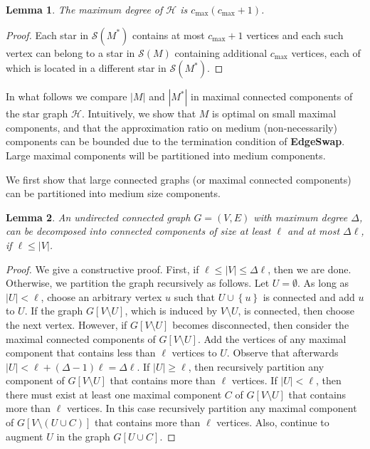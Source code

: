 \documentclass[11pt]{article}
\newtheorem{lemma}{Lemma}
\newcommand{\set}[1]{\left\{ #1 \right\}}
\newcommand{\abs}[1]{\left| #1 \right|}
\newcommand{\cmax}{c_{\max}}
\newcommand{\calS}{\mathcal{S}}
\newcommand{\calH}{\mathcal{H}}
\begin{document}
\begin{lemma}
\label{lemma:maxdegH}
The maximum degree of $\calH$ is $\cmax(\cmax+1)$.
\end{lemma}
\begin{proof}
Each star in $\calS(M^*)$ contains at most $\cmax+1$ vertices and each
such vertex can belong to a star in $\calS(M)$ containing additional
$\cmax$ vertices, each of which is located in a different star in
$\calS(M^*)$.
\end{proof}

In what follows we compare $\abs{M}$ and $\abs{M^*}$ in maximal
connected components of the star graph $\calH$.  Intuitively, we show
that $M$ is optimal on small maximal components, and that the
approximation ratio on medium (non-necessarily) components can be
bounded due to the termination condition of \textbf{EdgeSwap}.  Large
maximal components will be partitioned into medium components.

We first show that large connected graphs (or maximal connected
components) can be partitioned into medium size components.

\begin{lemma}
\label{lemma:dec}
An undirected connected graph $G = (V,E)$ with maximum degree
$\Delta$, can be decomposed into connected components of size at least
$\ell$ and at most $\Delta \ell$, if $\ell \leq \abs{V}$.
\end{lemma}
\begin{proof}%
We give a constructive proof.
%
First, if $\ell \leq |V| \leq \Delta \ell$, then we are done.
%
Otherwise, we partition the graph recursively as follows.  Let $U
= \emptyset$.  As long as $\abs{U} < \ell$, choose an arbitrary vertex
$u$ such that $U \cup \set{u}$ is connected and add $u$ to $U$.
%
If the graph $G[V \setminus U]$, which is induced by $V \setminus U$,
is connected, then choose the next vertex.
%
However, if $G[V \setminus U]$ becomes disconnected, then consider the
maximal connected components of $G[V \setminus U]$.  Add the vertices
of any maximal component that contains less than $\ell$ vertices to
$U$.  Observe that afterwards $\abs{U} < \ell + (\Delta-1) \ell
= \Delta \ell$.
%
If $\abs{U} \geq \ell$, then recursively partition any component of
$G[V \setminus U]$ that contains more than $\ell$ vertices.
%
If $\abs{U} < \ell$, then there must exist at least one maximal
component $C$ of $G[V \setminus U]$ that contains more than $\ell$
vertices.  In this case recursively partition any maximal component of
$G[V \setminus (U \cup C)]$ that contains more than $\ell$ vertices.
Also, continue to augment $U$ in the graph $G[U \cup C]$.
\end{proof}
\end{document}
